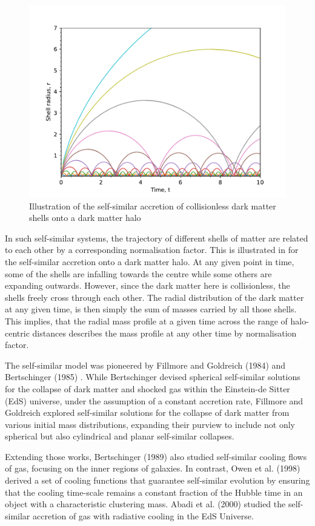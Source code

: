 \begin{figure}
\centering
\includegraphics[width=0.8\linewidth]{Figures/illustrate_self-sim_DM_shells.pdf}
\caption{Illustration of the self-similar accretion of collisionless dark matter shells onto a dark matter halo}
\label{fig:self_sim_illustrate}
\end{figure}

In such self-similar systems, the trajectory of different shells of matter are related to each other by a corresponding normalisation factor. This is illustrated in  for the self-similar accretion onto a dark matter halo. At any given point in time, some of the shells are infalling towards the centre while some others are expanding outwards. However, since the dark matter here is collisionless, the shells freely cross through each other. The radial distribution of the dark matter at any given time, is then simply the sum of masses carried by all those shells. This implies, that the radial mass profile at a given time across the range of halo-centric distances describes the mass profile at any other time by normalisation factor.

The self-similar model was pioneered by Fillmore and Goldreich (1984) \cite{1984FillmoreGoldreich} and Bertschinger (1985) \cite{1985ApJS...58...39B}. While Bertschinger devised spherical self-similar solutions for the collapse of dark matter and shocked gas within the Einstein-de Sitter (EdS) universe, under the assumption of a constant accretion rate, Fillmore and Goldreich explored self-similar solutions for the collapse of dark matter from various initial mass distributions, expanding their purview to include not only spherical but also cylindrical and planar self-similar collapses. 

Extending those works, Bertschinger (1989) \citep{1985ApJS...58...39B} also studied self-similar cooling flows of gas, focusing on the inner regions of galaxies. In contrast, Owen et al. (1998) \citep{1998OwenWeinberg_etal} derived a set of cooling functions that guarantee self-similar evolution by ensuring that the cooling time-scale remains a constant fraction of the Hubble time in an object with a characteristic clustering mass. Abadi et al. (2000) \citep{2000Abadi_etal_SelfSimCool} studied the self-similar accretion of gas with radiative cooling in the EdS Universe.

